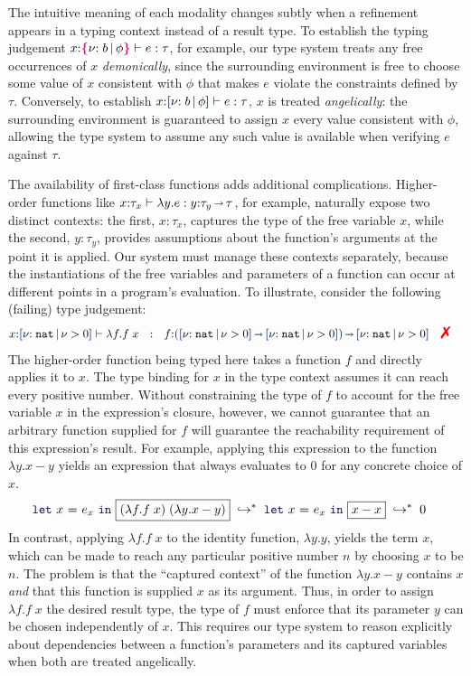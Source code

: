 The intuitive meaning of each modality changes subtly when a
refinement appears in a typing context instead of a result type. To
establish the typing judgement $x{:} \textcolor{magenta}{\mbox{\rm\textbf{\{}}} { {\nu}{:}\;{b}\, |\, {\phi} } \textcolor{magenta}{\mbox{\rm\textbf{\}}}} \vdash e : \tau$,
for example, our type system treats any free occurrences of $x$
\emph{demonically}, since the surrounding environment is free to
choose some value of $x$ consistent with $\phi$ that makes $e$ violate
the constraints defined by $\tau$. Conversely, to establish
$x{:}\urt{b}{\phi} \vdash e : \tau$, $x$ is treated \emph{angelically}:
the surrounding environment is guaranteed to assign $x$ every value
consistent with $\phi$, allowing the type system to assume any such
value is available when verifying $e$ against $\tau$.

The availability of first-class functions adds additional
complications. Higher-order functions like
$x{:} \tau_x \vdash \lambda y. e : y{:}\tau_y {\,\shortrightarrow\,} \tau$, for
example, naturally expose two distinct contexts: the first,
$x{:} \tau_x$, captures the type of the free variable $x$, while the
second, $y{:} \tau_y$, provides assumptions about the function's
arguments at the point it is applied. Our system must manage these
contexts separately, because the instantiations of the free variables
and parameters of a function can occur at different points in a
program's evaluation. To illustrate, consider the following (failing)
type judgement:
\vspace{-0.2em}
\begin{align*}
    x{:}\urt{\Nat}{\vnu > 0} &\vdash  \lambda f. f\;x ~~:~~ f{:}(\urt{\Nat}{\vnu > 0}\sarr \urt{\Nat}{\vnu > 0}) \sarr \urt{\Nat}{\vnu > 0} \quad\judgfail
\end{align*}\noindent
The higher-order function being typed here takes a function $f$ and
directly applies it to $x$. The type binding for $x$ in the type
context assumes it can reach every positive number.  Without
constraining the type of $f$ to account for the free variable $x$ in
the expression's closure, however, we cannot guarantee that an
arbitrary function supplied for $f$ will guarantee the reachability
requirement of this expression's result.  For example, applying this
expression to the function $\lambda y.x - y$ yields an expression that
always evaluates to $0$ for any concrete choice of $x$.%
\vspace{-0.2em}
\begin{align*}
  & \zlet{x}{e_x}{\boxed{(\lambda f. f\;x)\;(\lambda y.x - y)}} \;\hookrightarrow^*
    \; \zlet{x}{e_x}{\boxed{x - x}} \;\hookrightarrow^*\; 0
\end{align*}\noindent
In contrast, applying $\lambda f. f\;x$ to the identity function,
$\lambda y.y$, yields the term $x$, which can be made to reach any
particular positive number $n$ by choosing $x$ to be $n$.  The problem
is that the ``captured context'' of the function $\lambda y.x - y$
contains $x$ \emph{and} that this function is supplied $x$ as its
argument. Thus, in order to assign $\lambda f. f\;x$ the desired
result type, the type of $f$ must enforce that its parameter $y$ can
be chosen independently of $x$. This requires our type system to
reason explicitly about dependencies between a function's parameters
and its captured variables when both are treated angelically.

